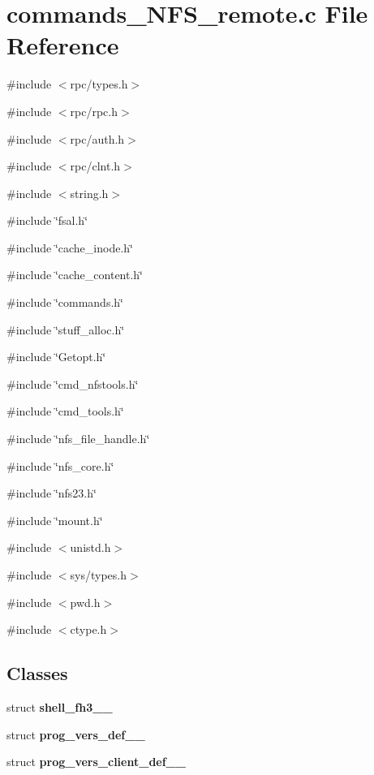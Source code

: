 \section{commands\_\-NFS\_\-remote.c File Reference}
\label{commands__NFS__remote_8c}
{\ttfamily \#include $<$rpc/types.h$>$}\par
{\ttfamily \#include $<$rpc/rpc.h$>$}\par
{\ttfamily \#include $<$rpc/auth.h$>$}\par
{\ttfamily \#include $<$rpc/clnt.h$>$}\par
{\ttfamily \#include $<$string.h$>$}\par
{\ttfamily \#include \char`\"{}fsal.h\char`\"{}}\par
{\ttfamily \#include \char`\"{}cache\_\-inode.h\char`\"{}}\par
{\ttfamily \#include \char`\"{}cache\_\-content.h\char`\"{}}\par
{\ttfamily \#include \char`\"{}commands.h\char`\"{}}\par
{\ttfamily \#include \char`\"{}stuff\_\-alloc.h\char`\"{}}\par
{\ttfamily \#include \char`\"{}Getopt.h\char`\"{}}\par
{\ttfamily \#include \char`\"{}cmd\_\-nfstools.h\char`\"{}}\par
{\ttfamily \#include \char`\"{}cmd\_\-tools.h\char`\"{}}\par
{\ttfamily \#include \char`\"{}nfs\_\-file\_\-handle.h\char`\"{}}\par
{\ttfamily \#include \char`\"{}nfs\_\-core.h\char`\"{}}\par
{\ttfamily \#include \char`\"{}nfs23.h\char`\"{}}\par
{\ttfamily \#include \char`\"{}mount.h\char`\"{}}\par
{\ttfamily \#include $<$unistd.h$>$}\par
{\ttfamily \#include $<$sys/types.h$>$}\par
{\ttfamily \#include $<$pwd.h$>$}\par
{\ttfamily \#include $<$ctype.h$>$}\par
\subsection*{Classes}
\begin{DoxyCompactItemize}
\item 
struct {\bf shell\_\-fh3\_\-\_\-}
\item 
struct {\bf prog\_\-vers\_\-def\_\-\_\-}
\item 
struct {\bf prog\_\-vers\_\-client\_\-def\_\-\_\-}
\end{DoxyCompactItemize}
